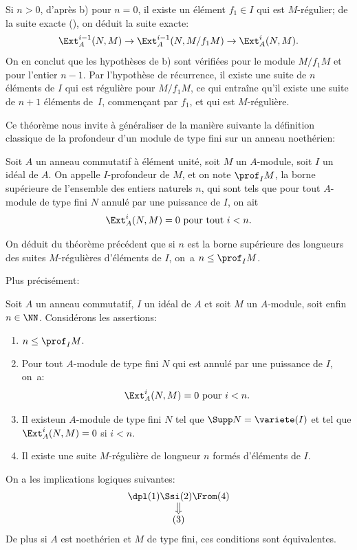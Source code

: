 Si $n>0$, d'apr\`es b) pour $n=0$, il existe un \'el\'ement $f_1\in I$ qui est $M$-r\'egulier; de la suite exacte (), on d\'eduit la suite exacte:
\begin{equation} \label{eq:III.2.2} \Ext_A^{i-1} (N, M) \to \Ext_A^{i-1} (N, M/f_1M) \to \Ext_A^i (N, M).
\end{equation}
On en conclut que les hypoth\`eses de b) sont v\'erifi\'ees pour le
module $M/f_1M$ et pour l'entier $n-1$. Par l'hypoth\`ese de
r\'ecurrence, il existe une suite de $n$ \'el\'ements de $I$ qui est
r\'eguli\`ere pour $M/f_1M$, ce qui entra\^ine qu'il existe une
suite de $n+1$ \'el\'ements de~$I$, commen\c cant par $f_1$, et qui
est $M$-r\'eguli\`ere.

Ce th\'eor\`eme nous invite \`a g\'en\'eraliser de la mani\`ere suivante la d\'efinition classique de la profondeur d'un module de type fini sur un anneau noeth\'erien:

\begin{definition} \label{III.2.3}
Soit $A$ un anneau commutatif \`a \'el\'ement unit\'e, soit $M$ un $A$-module, soit $I$ un id\'eal de $A$. On appelle $I$-profondeur de $M$, et on note $\prof_I M$, la borne sup\'erieure  de l'ensemble des entiers naturels $n$, qui sont tels que pour tout $A$-module de type fini $N$ annul\'e par une puissance de $I$, on ait
\[
\Ext_A^i(N, M)=0 \text{ pour tout } i< n.
\]
\end{definition}

On d\'eduit du th\'eor\`eme pr\'ec\'edent que si $n$ est la borne sup\'erieure des longueurs des suites $M$-r\'eguli\`eres d'\'el\'ements de $I$, on~a $n\leq\prof_I M$.

\noindent Plus pr\'ecis\'ement:

\begin{proposition} \label{III.2.4}
Soit $A$ un anneau commutatif, $I$ un id\'eal de $A$ et soit $M$ un $A$-module, soit enfin $n\in \NN$. Consid\'erons les assertions:
\begin{enumerate}
\item
$n\leq \prof_I M$.
\item
Pour tout $A$-module de type fini $N$ qui est annul\'e par une puissance de $I$, on~a:
\[
\Ext_A^i(N, M)=0 \text{ pour } i<n.
\]
\item
Il existe\pageoriginale un $A$-module de type fini $N$ tel que $\Supp N = \variete(I)$ et tel que $\Ext_A^i(N, M)=0$ si $i<n$.
\item
Il existe une suite $M$-r\'eguli\`ere de longueur $n$ form\'es d'\'el\'ements de $I$.
\end{enumerate}

On a les implications logiques suivantes:
\[
\begin{array}{c}\dpl \textup{(1)} \Ssi \textup{(2)} \From (4) \\
\big\Downarrow \\
\textup{(3)} \\
\end{array}
\]
De plus si $A$ est noeth\'erien et $M$ de type fini, ces conditions sont \'equivalentes.
\end{proposition}

